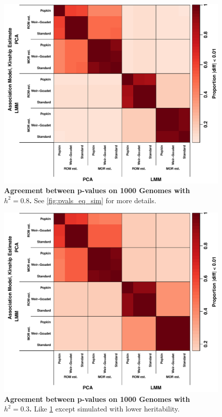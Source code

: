 \documentclass[11pt]{article}
\begin{document}
\begin{figure}[bp!]
  \centering
  \includegraphics[width=\textwidth]{tgp-nygc-autosomes_ld_prune_1000kb_0.3_maf-0.01/pvals_eq.pdf}
  \caption{
    {\bf Agreement between p-values on 1000 Genomes with $h^2=0.8$.}
    See \cref{fig:pvals_eq_sim} for more details.
  }
  \label{fig:pvals_eq_real}
\end{figure}

\begin{figure}[bp!]
  \centering
  \includegraphics[width=\textwidth]{tgp-nygc-autosomes_ld_prune_1000kb_0.3_maf-0.01/h-0.3/pvals_eq.pdf}
  \caption{
    {\bf Agreement between p-values on 1000 Genomes with $h^2=0.3$.}
    Like \cref{fig:pvals_eq_real} except simulated with lower heritability.
  }
  \label{fig:pvals_eq_real-h3}
\end{figure}
\end{document}
